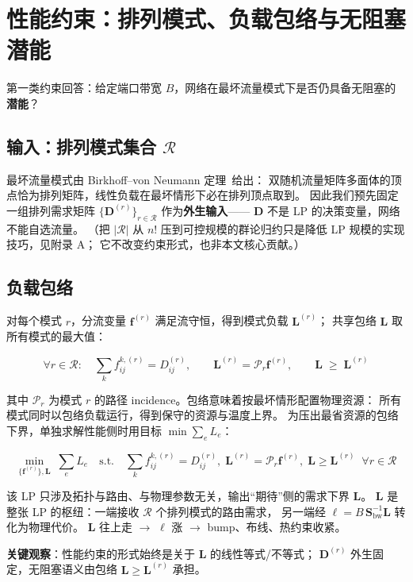\section{性能约束：排列模式、负载包络与无阻塞潜能}\label{sec:ov-performance}

第一类约束回答：给定端口带宽 $B$，网络在最坏流量模式下是否仍具备无阻塞的\textbf{潜能}？

\subsection{输入：排列模式集合 $\mathcal{R}$}

最坏流量模式由 Birkhoff--von Neumann 定理~\cite{birkhoff1946tres}给出：
双随机流量矩阵多面体的顶点恰为排列矩阵，线性负载在最坏情形下必在排列顶点取到。
因此我们预先固定一组排列需求矩阵 $\{\mathbf{D}^{(r)}\}_{r\in\mathcal{R}}$ 作为\textbf{外生输入}——
$\mathbf{D}$ 不是 LP 的决策变量，网络不能自选流量。
（把 $|\mathcal{R}|$ 从 $n!$ 压到可控规模的群论归约只是降低 LP 规模的实现技巧，见附录 A；
它不改变约束形式，也非本文核心贡献。）

\subsection{负载包络}

对每个模式 $r$，分流变量 $\mathbf{f}^{(r)}$ 满足流守恒，得到模式负载 $\mathbf{L}^{(r)}$；
共享包络 $\mathbf{L}$ 取所有模式的最大值：

\begin{equation}\label{eq:route-flow}
    \forall r \in \mathcal{R}:\quad
    \sum_k f_{ij}^{k,(r)} = D_{ij}^{(r)},\qquad
    \mathbf{L}^{(r)} = \mathcal{P}_r \mathbf{f}^{(r)},\qquad
    \mathbf{L} \;\ge\; \mathbf{L}^{(r)}
\end{equation}

其中 $\mathcal{P}_r$ 为模式 $r$ 的路径 incidence。包络意味着按最坏情形配置物理资源：
所有模式同时以包络负载运行，得到保守的资源与温度上界。
为压出最省资源的包络下界，单独求解性能侧时用目标 $\min\sum_e L_e$：

\begin{equation}\label{eq:valiant-lp}
    \min_{\{\mathbf{f}^{(r)}\}, \mathbf{L}} \; \sum_e L_e
    \quad\text{s.t.}\quad
    \sum_k f_{ij}^{k,(r)} = D_{ij}^{(r)},\;
    \mathbf{L}^{(r)} = \mathcal{P}_r \mathbf{f}^{(r)},\;
    \mathbf{L} \ge \mathbf{L}^{(r)} \;\;\forall r \in \mathcal{R}
\end{equation}

该 LP 只涉及拓扑与路由、与物理参数无关，输出``期待''侧的需求下界 $\mathbf{L}$。
$\mathbf{L}$ 是整张 LP 的枢纽：一端接收 $\mathcal{R}$ 个排列模式的路由需求，
另一端经 $\boldsymbol{\ell} = B\,\mathbf{S}_{\text{bw}}^{-1}\mathbf{L}$ 转化为物理代价。
$\mathbf{L}$ 往上走 $\to$ $\boldsymbol{\ell}$ 涨 $\to$ bump、布线、热约束收紧。

\textbf{关键观察}：性能约束的形式始终是关于 $\mathbf{L}$ 的线性等式/不等式；
$\mathbf{D}^{(r)}$ 外生固定，无阻塞语义由包络 $\mathbf{L}\ge\mathbf{L}^{(r)}$ 承担。
